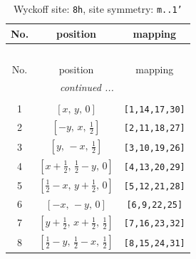 \documentclass[fleqn,8pt]{jsarticle}
\begin{document}
\begin{longtable}{ccc}
\caption{Wyckoff site: {\tt 8h}, site symmetry: {\tt m..1'}}
 \\
 \hline \hline
No. & position & mapping \\ \hline \endfirsthead

\multicolumn{2}{l}{\tablename\ \thetable{}} \\
 \hline \hline
No. & position & mapping \\ \hline \endhead

 \hline \hline
\multicolumn{2}{r}{\footnotesize\it continued ...} \\ \endfoot

 \hline \hline
\multicolumn{2}{r}{} \\ \endlastfoot

1 & $\left[ x,\, y,\, 0 \right]$ & {\tt [1,14,17,30]} \\ \hline
2 & $\left[ - y,\, x,\, \frac{1}{2} \right]$ & {\tt [2,11,18,27]} \\ \hline
3 & $\left[ y,\, - x,\, \frac{1}{2} \right]$ & {\tt [3,10,19,26]} \\ \hline
4 & $\left[ x + \frac{1}{2},\, \frac{1}{2} - y,\, 0 \right]$ & {\tt [4,13,20,29]} \\ \hline
5 & $\left[ \frac{1}{2} - x,\, y + \frac{1}{2},\, 0 \right]$ & {\tt [5,12,21,28]} \\ \hline
6 & $\left[ - x,\, - y,\, 0 \right]$ & {\tt [6,9,22,25]} \\ \hline
7 & $\left[ y + \frac{1}{2},\, x + \frac{1}{2},\, \frac{1}{2} \right]$ & {\tt [7,16,23,32]} \\ \hline
8 & $\left[ \frac{1}{2} - y,\, \frac{1}{2} - x,\, \frac{1}{2} \right]$ & {\tt [8,15,24,31]} \\
\end{longtable}
\renewcommand{\arraystretch}{1.2}
\end{document}
